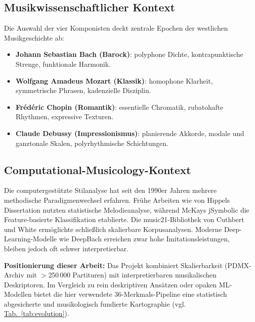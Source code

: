 \documentclass[10pt,a4paper]{article}
\theoremstyle{definition}
\begin{document}
\subsection{Musikwissenschaftlicher Kontext}
Die Auswahl der vier Komponisten deckt zentrale Epochen der westlichen Musikgeschichte ab:\autocite[Vgl. etwa][]{DebussyCharacteristics,ChopinTransformations}
\begin{itemize}
    \item \textbf{Johann Sebastian Bach (Barock)}: polyphone Dichte, kontrapunktische Strenge, funktionale Harmonik.
    \item \textbf{Wolfgang Amadeus Mozart (Klassik)}: homophone Klarheit, symmetrische Phrasen, kadenzielle Disziplin.
    \item \textbf{Frédéric Chopin (Romantik)}: essentielle Chromatik, rubatohafte Rhythmen, expressive Texturen.
    \item \textbf{Claude Debussy (Impressionismus)}: planierende Akkorde, modale und ganztonale Skalen, polyrhythmische Schichtungen.
\end{itemize}

\subsection{Computational-Musicology-Kontext}
Die computergestützte Stilanalyse hat seit den 1990er Jahren mehrere methodische Paradigmenwechsel erfahren. Frühe Arbeiten wie von Hippels Dissertation\autocite{VonHippel2000} nutzten statistische Melodieanalyse, während McKays jSymbolic\autocite{McKay2010} die Feature-basierte Klassifikation etablierte. Die music21-Bibliothek von Cuthbert\autocite{Cuthbert2010} und White\autocite{White2013} ermöglichte schließlich skalierbare Korpusanalysen. Moderne Deep-Learning-Modelle wie DeepBach\autocite{Hadjeres2018} erreichen zwar hohe Imitationsleistungen, bleiben jedoch oft schwer interpretierbar.

\textbf{Positionierung dieser Arbeit:} Das Projekt kombiniert Skalierbarkeit (PDMX-Archiv mit $>$250\,000 Partituren\autocite{PDMX2024}) mit interpretierbaren musikalischen Deskriptoren. Im Vergleich zu rein deskriptiven Ansätzen oder opaken ML-Modellen bietet die hier verwendete 36-Merkmals-Pipeline eine statistisch abgesicherte und musikologisch fundierte Kartographie (vgl. \hyperref[tab:evolution]{Tab.~\ref*{tab:evolution}}).
\end{document}
